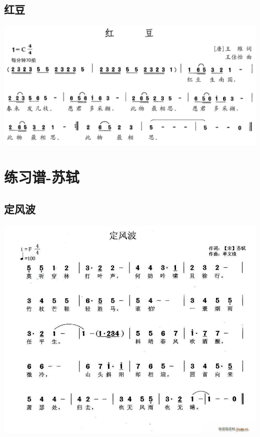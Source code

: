 \documentclass[cn,pad,chinesefont=nofont,twocol]{elegantbook}
\begin{document}
\section{红豆}
    \includegraphics[width=\textwidth]{dongxiao/20200628-王维-红豆} 

\chapter{练习谱-苏轼}
\section{定风波}
    \includegraphics[width=\textwidth]{dongxiao/20200411-定风波.jpg}
\end{document}
